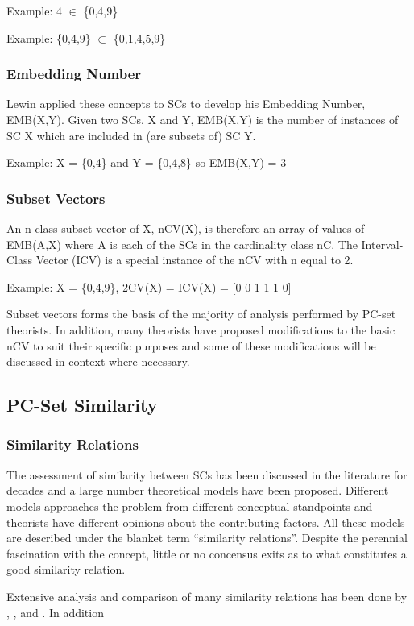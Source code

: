 \documentclass{article}
\begin{document}
Example: 4 $\in$ \{0,4,9\}

Example: \{0,4,9\} $\subset$ \{0,1,4,5,9\}
\subsubsection{Embedding Number}
\label{sec-3-3-2}

Lewin \citep{Lewin1979} applied these concepts to SCs to develop his
Embedding Number, EMB(X,Y). Given two SCs, X and Y, EMB(X,Y) is the
number of instances of SC X which are included in (are subsets of) SC
Y.

Example: X = \{0,4\} and Y = \{0,4,8\} so EMB(X,Y) = 3
\subsubsection{Subset Vectors}
\label{sec-3-3-3}

An n-class subset vector of X, nCV(X), is therefore an array of values
of EMB(A,X) where A is each of the SCs in the cardinality class
nC. The Interval-Class Vector (ICV) is a special instance of the nCV
with n equal to 2.

Example: X = \{0,4,9\}, 2CV(X) = ICV(X) = [0 0 1 1 1 0]

Subset vectors forms the basis of the majority of analysis performed
by PC-set theorists. In addition, many theorists have proposed
modifications to the basic nCV to suit their specific purposes and
some of these modifications will be discussed in context where
necessary.
\subsection{PC-Set Similarity}
\label{sec-3-4}
\subsubsection{Similarity Relations}
\label{sec-3-4-1}

The assessment of similarity between SCs has been discussed in the
literature for decades and a large number theoretical models have been
proposed. Different models approaches the problem from different
conceptual standpoints and theorists have different opinions about the
contributing factors. All these models are described under the blanket
term ``similarity relations''. Despite the perennial fascination with
the concept, little or no concensus exits as to what constitutes a
good similarity relation.

Extensive analysis and comparison of many similarity relations has
been done by \citep{Isaacson1992}, \citep{Buchler1997},
\citep{Hermann1994} and \citep{Castren1994}. In addition 
\end{document}
